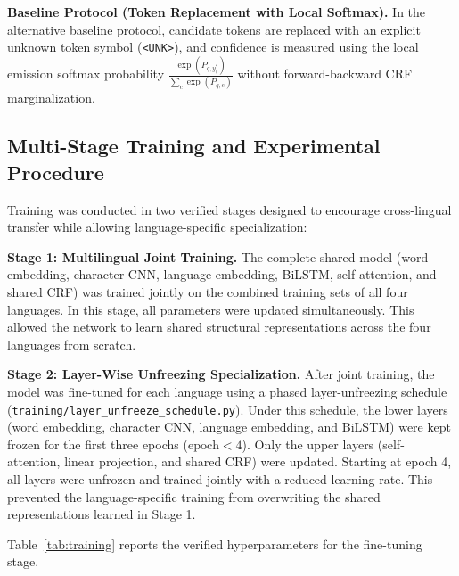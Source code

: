 \documentclass[pdflatex,sn-mathphys-num]{sn-jnl}
\begin{document}
\textbf{Baseline Protocol (Token Replacement with Local Softmax).} In the alternative baseline protocol, candidate tokens are replaced with an explicit unknown token symbol (\texttt{<UNK>}), and confidence is measured using the local emission softmax probability $\frac{\exp(P_{q, y^*_q})}{\sum_c \exp(P_{q, c})}$ without forward-backward CRF marginalization.

\subsection{Multi-Stage Training and Experimental Procedure}\label{subsec:training}

Training was conducted in two verified stages designed to encourage cross-lingual transfer while allowing language-specific specialization:

\textbf{Stage 1: Multilingual Joint Training.} The complete shared model (word embedding, character CNN, language embedding, BiLSTM, self-attention, and shared CRF) was trained jointly on the combined training sets of all four languages. In this stage, all parameters were updated simultaneously. This allowed the network to learn shared structural representations across the four languages from scratch.

\textbf{Stage 2: Layer-Wise Unfreezing Specialization.} After joint training, the model was fine-tuned for each language using a phased layer-unfreezing schedule (\texttt{training/layer\_unfreeze\_schedule.py}). Under this schedule, the lower layers (word embedding, character CNN, language embedding, and BiLSTM) were kept frozen for the first three epochs ($\text{epoch} < 4$). Only the upper layers (self-attention, linear projection, and shared CRF) were updated. Starting at epoch 4, all layers were unfrozen and trained jointly with a reduced learning rate. This prevented the language-specific training from overwriting the shared representations learned in Stage 1.

Table~\ref{tab:training} reports the verified hyperparameters for the fine-tuning stage.
\end{document}
